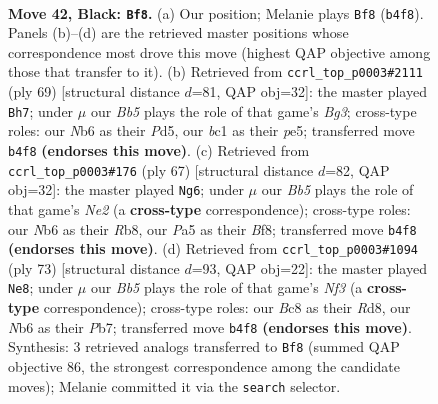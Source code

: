 \documentclass[11pt]{article}
\begin{document}
\clearpage

\begin{figure}[p]\centering
\begin{subfigure}{0.46\textwidth}\centering
\resizebox{\linewidth}{!}{%
\newchessgame
\chessboard[
  setfen={1nb5/1p6/1n4k1/pN1p1pp1/1b4Pp/PP2P2P/4PK2/2BB4 b - - 0 42},
  showmover=false,
  pgfstyle=straightmove, color=movearrow, markmove={b4-f8}
]}
\caption{}
\end{subfigure}\hfill
\begin{subfigure}{0.46\textwidth}\centering
\resizebox{\linewidth}{!}{%
\newchessgame
\chessboard[
  setfen={8/4kpp1/1p2p1bp/p2pP2P/P2P2P1/2B3K1/1Pn1BP2/8 b - - 0 35},
  showmover=false,
  pgfstyle=straightmove, color=movearrow, markmove={g6-h7}
]}
\caption{}
\end{subfigure}
\\[4pt]
\begin{subfigure}{0.46\textwidth}\centering
\resizebox{\linewidth}{!}{%
\newchessgame
\chessboard[
  setfen={1r3bk1/1pNRnp2/7p/2p3p1/p1b2PP1/P3P2P/1P4BK/2B5 b - - 1 34},
  showmover=false,
  pgfstyle=straightmove, color=movearrow, markmove={e7-g6}
]}
\caption{}
\end{subfigure}\hfill
\begin{subfigure}{0.46\textwidth}\centering
\resizebox{\linewidth}{!}{%
\newchessgame
\chessboard[
  setfen={3r4/1p2b3/p3knp1/3pBp1p/3P3P/P2K1PP1/1P6/2R4B b - - 5 37},
  showmover=false,
  pgfstyle=straightmove, color=movearrow, markmove={f6-e8}
]}
\caption{}
\end{subfigure}
\caption{\textbf{Move 42, Black: \texttt{Bf8}.} (a) Our position; Melanie plays \texttt{Bf8} (\texttt{b4f8}). Panels (b)--(d) are the retrieved master positions whose correspondence most drove this move (highest QAP objective among those that transfer to it). (b) Retrieved from \texttt{ccrl\_top\_p0003\#2111} (ply 69) [structural distance $d$=81, QAP obj=32]: the master played \texttt{Bh7}; under $\mu$ our \emph{Bb5} plays the role of that game's \emph{Bg3}; cross-type roles: our \emph{N}b6 as their \emph{P}d5, our \emph{b}c1 as their \emph{p}e5; transferred move \texttt{b4f8} \textbf{(endorses this move)}. (c) Retrieved from \texttt{ccrl\_top\_p0003\#176} (ply 67) [structural distance $d$=82, QAP obj=32]: the master played \texttt{Ng6}; under $\mu$ our \emph{Bb5} plays the role of that game's \emph{Ne2} (a \textbf{cross-type} correspondence); cross-type roles: our \emph{N}b6 as their \emph{R}b8, our \emph{P}a5 as their \emph{B}f8; transferred move \texttt{b4f8} \textbf{(endorses this move)}. (d) Retrieved from \texttt{ccrl\_top\_p0003\#1094} (ply 73) [structural distance $d$=93, QAP obj=22]: the master played \texttt{Ne8}; under $\mu$ our \emph{Bb5} plays the role of that game's \emph{Nf3} (a \textbf{cross-type} correspondence); cross-type roles: our \emph{B}c8 as their \emph{R}d8, our \emph{N}b6 as their \emph{P}b7; transferred move \texttt{b4f8} \textbf{(endorses this move)}. Synthesis: 3 retrieved analogs transferred to \texttt{Bf8} (summed QAP objective 86, the strongest correspondence among the candidate moves); Melanie committed it via the \texttt{search} selector.}
\label{fig:thought-m83}
\end{figure}
\end{document}
